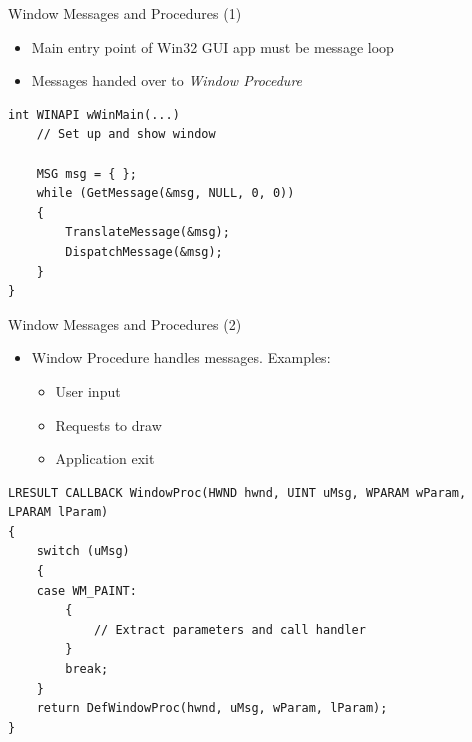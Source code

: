 \documentclass[usenames, dvipsnames]{beamer}
\begin{document}
	\begin{frame}[fragile]{Window Messages and Procedures (1)}
		\begin{itemize}
			\item Main entry point of Win32 GUI app must be message
				loop
			\item Messages handed over to \textit{Window Procedure}
		\end{itemize}
		\hfill
		\begin{lstlisting}
int WINAPI wWinMain(...)
	// Set up and show window

	MSG msg = { };
	while (GetMessage(&msg, NULL, 0, 0))
	{
		TranslateMessage(&msg);
		DispatchMessage(&msg);
	}
}
		\end{lstlisting}
	\end{frame}
	\begin{frame}[fragile]{Window Messages and Procedures (2)}
		\begin{itemize}
			\item Window Procedure handles messages. Examples:
				\begin{itemize}
					\item User input
					\item Requests to draw
					\item Application exit
				\end{itemize}
		\end{itemize}
		\begin{lstlisting}
LRESULT CALLBACK WindowProc(HWND hwnd, UINT uMsg, WPARAM wParam, LPARAM lParam)
{
	switch (uMsg)
	{
	case WM_PAINT:
		{
			// Extract parameters and call handler
		}
		break;
	}
	return DefWindowProc(hwnd, uMsg, wParam, lParam);
}
		\end{lstlisting}
	\end{frame}
\end{document}
